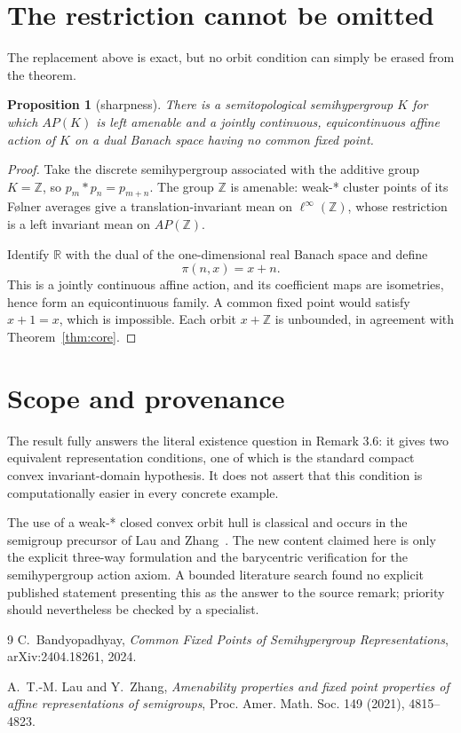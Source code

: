 \documentclass[10pt]{article}
\newtheorem{proposition}[theorem]{Proposition}
\begin{document}
\section*{The restriction cannot be omitted}

The replacement above is exact, but no orbit condition can simply be erased
from the theorem.

\begin{proposition}[sharpness]\label{prop:sharp}
There is a semitopological semihypergroup $K$ for which $AP(K)$ is left
amenable and a jointly continuous, equicontinuous affine action of $K$ on a
dual Banach space having no common fixed point.
\end{proposition}

\begin{proof}
Take the discrete semihypergroup associated with the additive group
$K=\mathbb Z$, so $p_m*p_n=p_{m+n}$.  The group $\mathbb Z$ is amenable:
weak-* cluster points of its F\o lner averages give a translation-invariant
mean on $\ell^\infty(\mathbb Z)$, whose restriction is a left invariant mean
on $AP(\mathbb Z)$.

Identify $\mathbb R$ with the dual of the one-dimensional real Banach space
and define
\[
                    \pi(n,x)=x+n.
\]
This is a jointly continuous affine action, and its coefficient maps are
isometries, hence form an equicontinuous family.  A common fixed point would
satisfy $x+1=x$, which is impossible.  Each orbit $x+\mathbb Z$ is unbounded,
in agreement with Theorem~\ref{thm:core}.
\end{proof}

\section*{Scope and provenance}

The result fully answers the literal existence question in Remark 3.6: it
gives two equivalent representation conditions, one of which is the standard
compact convex invariant-domain hypothesis.  It does not assert that this
condition is computationally easier in every concrete example.

The use of a weak-* closed convex orbit hull is classical and occurs in the
semigroup precursor of Lau and Zhang~\cite{LauZhang2021}.  The new content
claimed here is only the explicit three-way formulation and the barycentric
verification for the semihypergroup action axiom.  A bounded literature search
found no explicit published statement presenting this as the answer to the
source remark; priority should nevertheless be checked by a specialist.

{\small
\begin{thebibliography}{9}
C.~Bandyopadhyay,
\emph{Common Fixed Points of Semihypergroup Representations},
arXiv:2404.18261, 2024.

A.~T.-M. Lau and Y.~Zhang,
\emph{Amenability properties and fixed point properties of affine
representations of semigroups},
Proc. Amer. Math. Soc. 149 (2021), 4815--4823.
\end{thebibliography}
}
\end{document}
